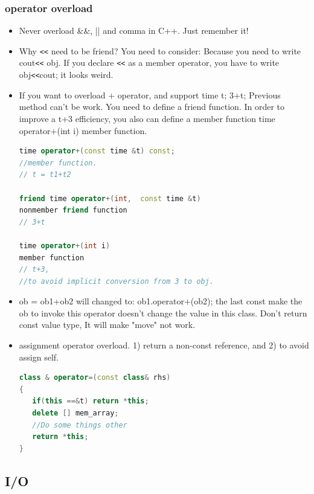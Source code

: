 \documentclass[a4paper,12pt,twoside]{book}
\begin{document}
\subsubsection{operator overload}

\begin{itemize}

\item Never overload \&\&, || and comma in C++.  Just remember it!

\item Why \verb=<<= need to be friend? You need to consider:  Because you need to write cout\verb=<<= obj. If you declare \verb=<<= as a member operator, you have to write obj\verb=<<=cout; it looks weird.

\item If you want to overload + operator, and support time t; 3+t;  Previous method can't be work. You need to define a friend function. In order to improve a t+3 efficiency, you also can define a member function time operator+(int i) member function.
\begin{lstlisting}[frame=single, language=c++]
time operator+(const time &t) const;
//member function.
// t = t1+t2

friend time operator+(int,  const time &t)
nonmember friend function
// 3+t

time operator+(int i)
member function
// t+3,
//to avoid implicit conversion from 3 to obj.
\end{lstlisting}

\item ob = ob1+ob2 will changed to:  ob1.operator+(ob2);  the last const make the ob to invoke this operator doesn't change the value in this class. Don't return const value type, It will make "move" not work.

\item assignment operator overload. 1) return a non-const reference, and 2) to avoid assign self.
\begin{lstlisting}[frame=single, language=c++]
class & operator=(const class& rhs)
{
   if(this ==&t) return *this;
   delete [] mem_array;
   //Do some things other
   return *this;
}
\end{lstlisting}

\end{itemize}









\subsection{I/O}
\end{document}
